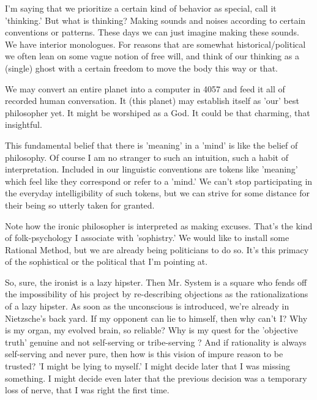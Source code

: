 \documentclass{article}
\begin{document}
I'm saying that we prioritize a certain kind of behavior as special, call it 'thinking.' But what is thinking? Making sounds and noises according to certain conventions or patterns. These days we can just imagine making these sounds. We have interior monologues. For reasons that are somewhat historical/political we often lean on some vague notion of free will, and think of our thinking as a (single) ghost with a certain freedom to move the body this way or that.
\newline

We may convert an entire planet into a computer in 4057 and feed it all of recorded human conversation. It (this planet) may establish itself as 'our' best philosopher yet. It might be worshiped as a God. It could be that charming, that insightful.
\newline

This fundamental belief that there is 'meaning' in a 'mind' is like the belief of philosophy. Of course I am no stranger to such an intuition, such a habit of interpretation. Included in our linguistic conventions are tokens like 'meaning' which feel like they correspond or refer to a 'mind.' We can't stop participating in the everyday intelligibility of such tokens, but we can strive for some distance for their being so utterly taken for granted.
\newline

Note how the ironic philosopher is interpreted as making excuses. That's the kind of folk-psychology I associate with 'sophistry.' We would like to install some Rational Method, but we are already being politicians to do so. It's this primacy of the sophistical or the political that I'm pointing at.
\newline

So, sure, the ironist is a lazy hipster. Then Mr. System is a square who fends off the impossibility of his project by re-describing objections as the rationalizations of a lazy hipster. As soon as the unconscious is introduced, we're already in Nietzsche's back yard. If my opponent can lie to himself, then why can't I? Why is my organ, my evolved brain, so reliable? Why is my quest for the 'objective truth' genuine and not self-serving or tribe-serving ? And if rationality is always self-serving and never pure, then how is this vision of impure reason to be trusted? 'I might be lying to myself.' I might decide later that I was missing something. I might decide even later that the previous decision was a temporary loss of nerve, that I was right the first time.
\newline
\end{document}
